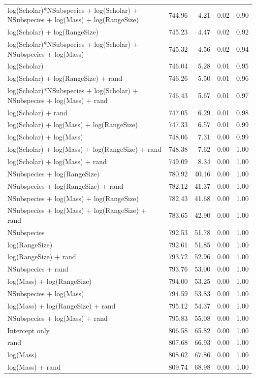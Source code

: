 \begin{table}[ht]
\begin{tabular}{@{}lrrrr@{}}
  log(Scholar)*NSubspecies + log(Scholar) + NSubspecies + log(Mass) + log(RangeSize) & 744.96 & 4.21 & 0.02 & 0.90 \\ 
  log(Scholar) + log(RangeSize) & 745.23 & 4.47 & 0.02 & 0.92 \\ 
  log(Scholar)*NSubspecies + log(Scholar) + NSubspecies + log(Mass) & 745.32 & 4.56 & 0.02 & 0.94 \\ 
  log(Scholar) & 746.04 & 5.28 & 0.01 & 0.95 \\ 
  log(Scholar) + log(RangeSize) + rand & 746.26 & 5.50 & 0.01 & 0.96 \\ 
  log(Scholar)*NSubspecies + log(Scholar) + NSubspecies + log(Mass) + rand & 746.43 & 5.67 & 0.01 & 0.97 \\ 
  log(Scholar) + rand & 747.05 & 6.29 & 0.01 & 0.98 \\ 
  log(Scholar) + log(Mass) + log(RangeSize) & 747.33 & 6.57 & 0.01 & 0.99 \\ 
  log(Scholar) + log(Mass) & 748.06 & 7.31 & 0.00 & 0.99 \\ 
  log(Scholar) + log(Mass) + log(RangeSize) + rand & 748.38 & 7.62 & 0.00 & 1.00 \\ 
  log(Scholar) + log(Mass) + rand & 749.09 & 8.34 & 0.00 & 1.00 \\ 
  NSubspecies + log(RangeSize) & 780.92 & 40.16 & 0.00 & 1.00 \\ 
  NSubspecies + log(RangeSize) + rand & 782.12 & 41.37 & 0.00 & 1.00 \\ 
  NSubspecies + log(Mass) + log(RangeSize) & 782.43 & 41.68 & 0.00 & 1.00 \\ 
  NSubspecies + log(Mass) + log(RangeSize) + rand & 783.65 & 42.90 & 0.00 & 1.00 \\ 
  NSubspecies & 792.53 & 51.78 & 0.00 & 1.00 \\ 
  log(RangeSize) & 792.61 & 51.85 & 0.00 & 1.00 \\ 
  log(RangeSize) + rand & 793.72 & 52.96 & 0.00 & 1.00 \\ 
  NSubspecies + rand & 793.76 & 53.00 & 0.00 & 1.00 \\ 
  log(Mass) + log(RangeSize) & 794.00 & 53.25 & 0.00 & 1.00 \\ 
  NSubspecies + log(Mass) & 794.59 & 53.83 & 0.00 & 1.00 \\ 
  log(Mass) + log(RangeSize) + rand & 795.12 & 54.37 & 0.00 & 1.00 \\ 
  NSubspecies + log(Mass) + rand & 795.83 & 55.08 & 0.00 & 1.00 \\ 
  Intercept only & 806.58 & 65.82 & 0.00 & 1.00 \\ 
  rand & 807.68 & 66.93 & 0.00 & 1.00 \\ 
  log(Mass) & 808.62 & 67.86 & 0.00 & 1.00 \\ 
  log(Mass) + rand & 809.74 & 68.98 & 0.00 & 1.00 \\ 
   \bottomrule
\end{tabular}
\endgroup
\end{table}




